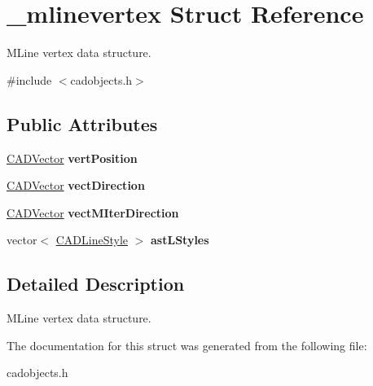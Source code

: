 \hypertarget{struct__mlinevertex}{}\section{\+\_\+mlinevertex Struct Reference}
\label{struct__mlinevertex}


M\+Line vertex data structure.  




{\ttfamily \#include $<$cadobjects.\+h$>$}

\subsection*{Public Attributes}
\begin{DoxyCompactItemize}
\item 
\hyperlink{class_c_a_d_vector}{C\+A\+D\+Vector} {\bfseries vert\+Position}\hypertarget{struct__mlinevertex_a78923ca08facf24ce52461e0be04f2d6}{}\label{struct__mlinevertex_a78923ca08facf24ce52461e0be04f2d6}

\item 
\hyperlink{class_c_a_d_vector}{C\+A\+D\+Vector} {\bfseries vect\+Direction}\hypertarget{struct__mlinevertex_a408dec36a9a9c44e1e901bb2ed9d44de}{}\label{struct__mlinevertex_a408dec36a9a9c44e1e901bb2ed9d44de}

\item 
\hyperlink{class_c_a_d_vector}{C\+A\+D\+Vector} {\bfseries vect\+M\+Iter\+Direction}\hypertarget{struct__mlinevertex_add4d40c6e20a736085a75ac7077c5c22}{}\label{struct__mlinevertex_add4d40c6e20a736085a75ac7077c5c22}

\item 
vector$<$ \hyperlink{struct__linestyle}{C\+A\+D\+Line\+Style} $>$ {\bfseries ast\+L\+Styles}\hypertarget{struct__mlinevertex_aaf071abb7382f6822e1d26b00db22dd5}{}\label{struct__mlinevertex_aaf071abb7382f6822e1d26b00db22dd5}

\end{DoxyCompactItemize}


\subsection{Detailed Description}
M\+Line vertex data structure. 

The documentation for this struct was generated from the following file\+:\begin{DoxyCompactItemize}
\item 
cadobjects.\+h\end{DoxyCompactItemize}
